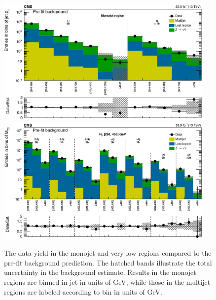 \begin{figure}
	\centering
	\includegraphics[width=0.95\textwidth]{results/figs/mt2_monojet_fullEstimate}
	\includegraphics[width=0.95\textwidth]{results/figs/mt2_veryLowHT_fullEstimate}
	\caption{The data yield in the monojet and very-low \HT regions compared to the pre-fit background prediction. The hatched bands illustrate the total uncertainty in the background estimate. Results in the monojet regions are binned in jet \pt in units of GeV, while those in the multijet regions are labeled according to \mttwo bin in units of GeV.}
	\label{fig:yieldPrefit1}
\end{figure}

